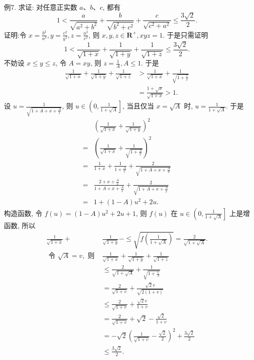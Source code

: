 例7. 求证: 对任意正实数 $a 、 b 、 c$, 都有
$$
1<\frac{a}{\sqrt{a^2+b^2}}+\frac{b}{\sqrt{b^2+c^2}}+\frac{c}{\sqrt{c^2+a^2}} \leqslant \frac{3 \sqrt{2}}{2} .
$$
证明:令 $x=\frac{b^2}{a^2}, y=\frac{c^2}{b^2}, z=\frac{a^2}{c^2}$, 则 $x, y, z \in \mathbf{R}^{+}, x y z=1$. 于是只需证明
$$
1<\frac{1}{\sqrt{1+x}}+\frac{1}{\sqrt{1+y}}+\frac{1}{\sqrt{1+z}} \leqslant \frac{3 \sqrt{2}}{2} .
$$
不妨设 $x \leqslant y \leqslant z$, 令 $A=x y$, 则 $z=\frac{1}{A}, A \leqslant 1$. 于是
$$
\begin{aligned}
\frac{1}{\sqrt{1+x}}+\frac{1}{\sqrt{1+y}}+\frac{1}{\sqrt{1+z}} & >\frac{1}{\sqrt{1+x}}+\frac{1}{\sqrt{1+\frac{1}{x}}} \\
& =\frac{1+\sqrt{x}}{\sqrt{1+x}}>1 .
\end{aligned}
$$
设 $u=\frac{1}{\sqrt{1+A+x+\frac{A}{x}}}$, 则 $u \in\left(0, \frac{1}{1+\sqrt{A}}\right]$, 当且仅当 $x=\sqrt{A}$ 时,
$u=\frac{1}{1+\sqrt{A}}$. 于是
$$
\begin{aligned}
& \left(\frac{1}{\sqrt{1+x}}+\frac{1}{\sqrt{1+y}}\right)^2 \\
= & \left(\frac{1}{\sqrt{1+x}}+\frac{1}{\sqrt{1+\frac{A}{x}}}\right)^2 \\
= & \frac{1}{1+x}+\frac{1}{1+\frac{A}{x}}+\frac{2}{\sqrt{1+A+x+\frac{A}{x}}} \\
= & \frac{2+x+\frac{A}{x}}{1+A+x+\frac{A}{\dot{x}}}+\frac{2}{\sqrt{1+A+x+\frac{A}{x}}} \\
= & 1+(1-A) u^2+2 u .
\end{aligned}
$$
构造函数, 令 $f(u)=(1-A) u^2+2 u+1$, 则 $f(u)$ 在 $u \in\left(0, \frac{1}{1+\sqrt{A}}\right]$ 上是增函数, 所以
$$
\begin{aligned}
\frac{1}{\sqrt{1+x}}+ & \frac{1}{\sqrt{1+y}}-\leqslant \sqrt{f\left(\frac{1}{1+\sqrt{A}}\right)}=\frac{2}{\sqrt{1+\sqrt{A}}} . \\
\text { 令 } \sqrt{A}=v, \text { 则 } & \frac{1}{\sqrt{1+x}}+\frac{1}{\sqrt{1+y}}+\frac{1}{\sqrt{1+z}} \\
& \leqslant \frac{2}{\sqrt{1+\sqrt{A}}}+\frac{1}{\sqrt{1+\frac{1}{A}}} \\
& =\frac{2}{\sqrt{1+v}}+\frac{\sqrt{2} v}{\sqrt{2(1+v)}} \\
& \leqslant \frac{2}{\sqrt{1+v}}+\frac{\sqrt{2} v}{1+v} \\
& =\frac{2}{\sqrt{1+v}}+\sqrt{2}-\frac{\sqrt{2}}{1+v} \\
& =-\sqrt{2}\left(\frac{1}{\sqrt{1+v}}-\frac{\sqrt{2}}{2}\right)^2+\frac{3 \sqrt{2}}{2} \\
& \leqslant \frac{3 \sqrt{2}}{2} .
\end{aligned}
$$



